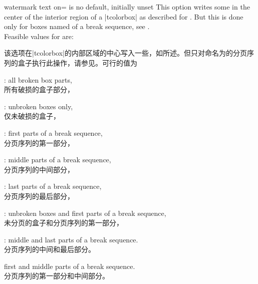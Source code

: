 \begin{docTcbKey}{watermark text on}{= is }{no default, initially unset}
This option writes some  in the center of the interior region of a |tcolorbox|
as described for .
But this is done only for boxes named  of a break sequence, see
.\\ 
Feasible values for  are:

该选项在|tcolorbox|的内部区域的中心写入一些，如所述。但只对命名为的分页序列的盒子执行此操作，请参见。可行的值为
\begin{DescriptionL}{}

\item{}: all broken box parts,
\\所有破损的盒子部分，
\item{}: unbroken boxes only,
\\仅未破损的盒子，
\item{}: first parts of a break sequence,
\\分页序列的第一部分，
\item{}: middle parts of a break sequence,
\\分页序列的中间部分，
\item{}: last parts of a break sequence,
\\分页序列的最后部分，
\item{}: unbroken boxes and first parts of a break sequence,
\\未分页的盒子和分页序列的第一部分，
\item[\docValue{middle and last}]: middle and last parts of a break sequence.
\\分页序列的中间和最后部分。
\item[\docValue{first and middle}] first and middle parts of a break sequence.
\\分页序列的第一部分和中间部分。
\end{DescriptionL}
\end{docTcbKey}


